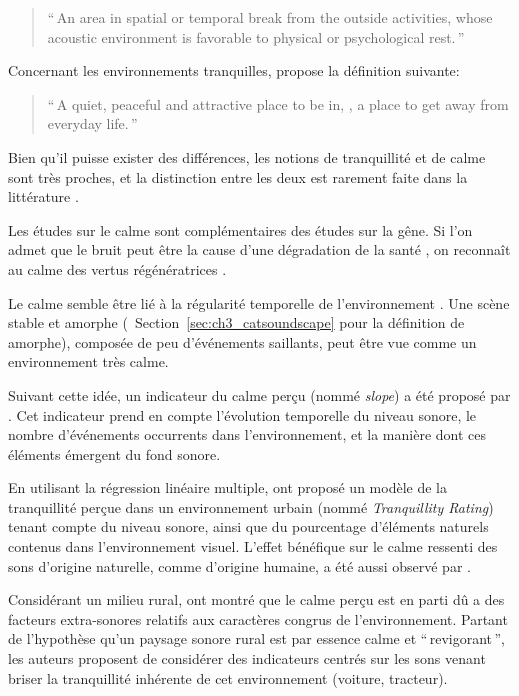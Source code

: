 {\begin{quote}
``\,An area in spatial or temporal break from the outside activities, whose acoustic environment is favorable to physical or psychological rest.\,''
\end{quote}

Concernant les environnements tranquilles, \citep{pheasant2008acoustic} propose la définition suivante:

\begin{quote}
``\,A quiet, peaceful and attractive place to be in, \ie, a place to get away from everyday life.\,''
\end{quote}

Bien qu'il puisse exister des différences, les notions de tranquillité et de calme sont très proches, et la distinction entre les deux est rarement faite dans la littérature \citep{delaitre2012definition}. 

Les études sur le calme sont complémentaires des études sur la gêne. Si l'on admet que le bruit peut être la cause d'une dégradation de la santé \citep{stansfeld2005aircraft}, on reconnaît au calme des vertus régénératrices \citep{payne2013production,de2006quiet}.

Le calme semble être lié à la régularité temporelle de l'environnement \citep{delaitre2012definition}. Une scène stable et amorphe (\cf~Section~\ref{sec:ch3_catsoundscape} pour la définition de amorphe), composée de peu d'événements saillants, peut être vue comme un environnement très calme. 

Suivant cette idée, un indicateur du calme perçu (nommé \emph{slope}) a été proposé par \citep{memoli2008soundscape}. Cet indicateur prend en compte l'évolution temporelle du niveau sonore, le nombre d'événements occurrents dans l'environnement, et la manière dont ces éléments émergent du fond sonore. 

En utilisant la régression linéaire multiple, \citep{pheasant2008acoustic,pheasant2009validation} ont proposé un modèle de la tranquillité perçue dans un environnement urbain (nommé \emph{Tranquillity Rating}) tenant compte du niveau sonore, ainsi que du pourcentage d'éléments naturels contenus dans l'environnement visuel. L'effet bénéfique sur le calme ressenti des sons d'origine naturelle, comme d'origine humaine, a été aussi observé par \citep{de2013characterizing}.

Considérant un milieu rural, \citep{de2006quiet} ont montré que le calme perçu est en parti dû a des facteurs extra-sonores relatifs aux caractères congrus de l'environnement. Partant de l'hypothèse qu'un paysage sonore rural est par essence calme et ``\,revigorant\,'', les auteurs proposent de considérer des indicateurs centrés sur les sons venant briser la tranquillité inhérente de cet environnement (voiture, tracteur).

}
